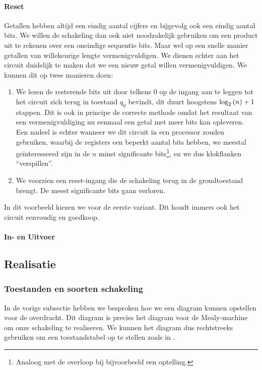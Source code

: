 \paragraph{Reset}
Getallen hebben altijd een eindig aantal cijfers en bijgevolg ook een eindig aantal bits. We willen de schakeling dan ook niet noodzakelijk gebruiken om een product uit te rekenen over een oneindige sequentie bits. Maar wel op een snelle manier getallen van willekeurige lengte vermenigvuldigen. We dienen echter aan het circuit duidelijk te maken dat we een nieuw getal willen vermenigvuldigen. We kunnen dit op twee manieren doen:
\begin{enumerate}
 \item We lezen de resterende bits uit door telkens $0$ op de ingang aan te leggen tot het circuit zich terug in toestand $q_0$ bevindt, dit duurt hoogstens $\log_2\left( n \right)+1$ stappen. Dit is ook in principe de correcte methode omdat het resultaat van een vermenigvuldiging nu eenmaal een getal met meer bits kan opleveren. Een nadeel is echter wanneer we dit circuit in een processor zouden gebruiken, waarbij de registers een beperkt aantal bits hebben, we meestal ge\"interesseerd zijn in de $n$ minst significante bits\footnote{Analoog met de overloop bij bijvoorbeeld een optelling.}, en we dus klokflanken ``verspillen''.
 \item We voorzien een reset-ingang die de schakeling terug in de grondtoestand brengt. De meest significante bits gaan verloren.
\end{enumerate}
In dit voorbeeld kiezen we voor de eerste variant. Dit houdt immers ook het circuit eenvoudig en goedkoop.
\paragraph{In- en Uitvoer}

\subsection{Realisatie}
\subsubsection{Toestanden en soorten schakeling}
In de vorige subsectie hebben we besproken hoe we een diagram kunnen opstellen voor de overdracht. Dit diagram is precies het diagram voor de Mealy-machine om onze schakeling te realiseren. We kunnen het diagram dus rechtstreeks gebruiken om een toestandstabel op te stellen zoals in .
